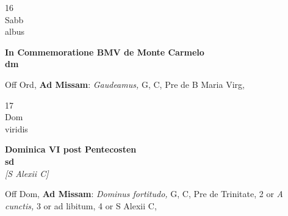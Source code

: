 \documentclass[10pt, openany]{book}
\begin{document}
        \begin{center}
            \begin{minipage}{3.5in}
                \vspace{2em}
                \begin{minipage}{0.5in}
                    {\Huge 16} \\
                    {\normalsize Sabb} \\
                    {\normalsize albus}
                \end{minipage}
                \begin{minipage}{3.0in}
                    \textbf{ \large In Commemoratione BMV de Monte Carmelo \\
                    \textnormal{\normalsize dm}} \\ 
                \end{minipage}
                \begin{justify}Off Ord, \textbf{Ad Missam}: \textit{Gaudeamus,} G, C, Pre  de B Maria Virg,   
                \end{justify}
            \end{minipage}
        \end{center}
    
        \begin{center}
            \begin{minipage}{3.5in}
                \vspace{2em}
                \begin{minipage}{0.5in}
                    {\Huge 17} \\
                    {\normalsize Dom} \\
                    {\normalsize viridis}
                \end{minipage}
                \begin{minipage}{3.0in}
                    \textbf{ \large Dominica VI post Pentecosten \\
                    \textnormal{\normalsize sd}} \\ \textit{[S Alexii C]} \\ 
                \end{minipage}
                \begin{justify}Off Dom, \textbf{Ad Missam}: \textit{Dominus fortitudo,} G, C, Pre de Trinitate, 2 or \textit{A cunctis,} 3 or ad libitum, 4 or S Alexii C,   
                \end{justify}
            \end{minipage}
        \end{center}
    
\end{document}
